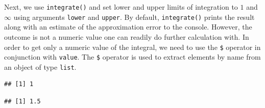 \documentclass[]{book}
\newenvironment{Shaded}{\begin{snugshade}}{\end{snugshade}}
\newcommand{\KeywordTok}[1]{\textcolor[rgb]{0.13,0.29,0.53}{\textbf{#1}}}
\newcommand{\DataTypeTok}[1]{\textcolor[rgb]{0.13,0.29,0.53}{#1}}
\newcommand{\DecValTok}[1]{\textcolor[rgb]{0.00,0.00,0.81}{#1}}
\newcommand{\StringTok}[1]{\textcolor[rgb]{0.31,0.60,0.02}{#1}}
\newcommand{\CommentTok}[1]{\textcolor[rgb]{0.56,0.35,0.01}{\textit{#1}}}
\newcommand{\OtherTok}[1]{\textcolor[rgb]{0.56,0.35,0.01}{#1}}
\newcommand{\OperatorTok}[1]{\textcolor[rgb]{0.81,0.36,0.00}{\textbf{#1}}}
\newcommand{\NormalTok}[1]{#1}
\theoremstyle{definition}
\theoremstyle{definition}
\theoremstyle{definition}
\theoremstyle{remark}
\begin{document}
Next, we use \texttt{integrate()} and set lower and upper limits of
integration to \(1\) and \(\infty\) using arguments \texttt{lower} and
\texttt{upper}. By default, \texttt{integrate()} prints the result along
with an estimate of the approximation error to the console. However, the
outcome is not a numeric value one can readily do further calculation
with. In order to get only a numeric value of the integral, we need to
use the \texttt{\$} operator in conjunction with \texttt{value}. The
\texttt{\$} operator is used to extract elements by name from an object
of type \texttt{list}.

\begin{Shaded}
\end{Shaded}

\begin{verbatim}
## [1] 1
\end{verbatim}

\begin{Shaded}
\end{Shaded}

\begin{verbatim}
## [1] 1.5
\end{verbatim}

\begin{Shaded}
\end{Shaded}
\end{document}
